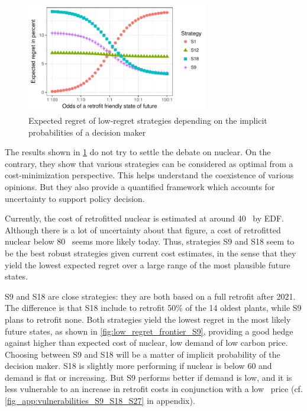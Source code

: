 \begin{figure}[!ht]
	\centering
	\includegraphics[width=8cm]{figures/odds_S9.pdf}
	\caption{Expected regret of low-regret strategies depending on the implicit probabilities of a decision maker}
	\label{fig:odds_S9}
\end{figure}

The results shown in \cref{fig:odds_S9} do not try to settle the debate on nuclear. On the contrary, they show that various strategies can be considered as optimal from a cost-minimization perspective. This helps understand the coexistence of various opinions. But they also provide a quantified framework which accounts for uncertainty to support policy decision. 

Currently, the cost of retrofitted nuclear is estimated at around 40 \emwh\ by EDF. Although there is a lot of uncertainty about that figure, a cost of retrofitted nuclear below 80 \emwh\ seems more likely today. Thus, strategies S9 and S18 seem to be the best robust strategies given current cost estimates, in the sense that they yield the lowest expected regret over a large range of the most plausible future states.

S9 and S18 are close strategies: they are both based on a full retrofit after 2021. The difference is that S18 include to retrofit 50\% of the 14 oldest plants, while S9 plans to retrofit none. 
Both strategies yield the lowest regret in the most likely future states, as shown in \ref{fig:low_regret_frontier_S9}, providing a good hedge against higher than expected cost of nuclear, low demand of low carbon price. 
Choosing between S9 and S18 will be a matter of implicit probability of the decision maker. S18 is slightly more performing if nuclear is below 60 \emwh and demand is flat or increasing. But S9 performs better if demand is low, and it is less vulnerable to an increase in retrofit costs in conjunction with a low \coo\ price (cf. \cref{fig_app:vulnerabilities_S9_S18_S27} in appendix).

